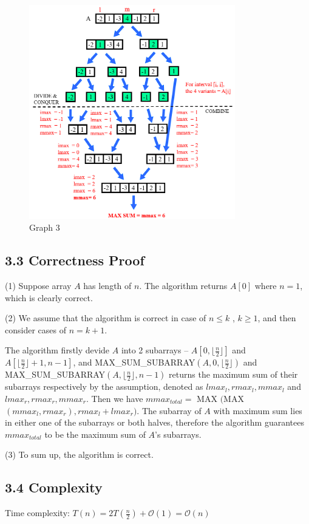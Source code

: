 \documentclass[UTF8]{ctexart}
\begin{document}
\begin{figure} [h]
	\centering
	\caption*{Graph 3}
	\includegraphics[width=0.8\textwidth]{figs/3.png}
\end{figure}

\subsection*{3.3 Correctness Proof} 
(1) Suppose array $A$ has length of $n$. The algorithm returns $A[0]$ where $ n = 1$, which is clearly correct.

(2) We assume that the algorithm is correct in case of $n \leq k$ , $k\geq 1$, and then consider cases of $n = k + 1$.

The algorithm firstly devide $A$ into 2 subarrays -- $A[0, \lfloor \frac{n}{2} \rfloor]$ and $A[\lfloor \frac{n}{2} \rfloor + 1, n-1]$, 
and MAX\_SUM\_SUBARRAY$(A,  0, \lfloor \frac{n}{2} \rfloor)$ and MAX\_SUM\_SUBARRAY$(A,  \lfloor \frac{n}{2} \rfloor, n-1)$ returns the 
maximum sum of their subarrays respectively by the assumption, denoted as $lmax_l, rmax_l, mmax_l$ and $lmax_r, rmax_r, mmax_r$. 
Then we have $mmax_{total} = $ MAX $( $MAX$ (mmax_l, rmax_r), rmax_l + lmax_r)$. The subarray of $A$ with maximum sum lies in either one of the subarrays or 
both halves, therefore the algorithm guarantees $mmax_{total}$ to be the maximum sum of $A$'s subarrays.

(3) To sum up, the algorithm is correct.
\subsection*{3.4 Complexity} 
Time complexity: $T(n) = 2T(\frac{n}{2}) + \mathcal{O}(1) = \mathcal{O}(n)$
\end{document}
